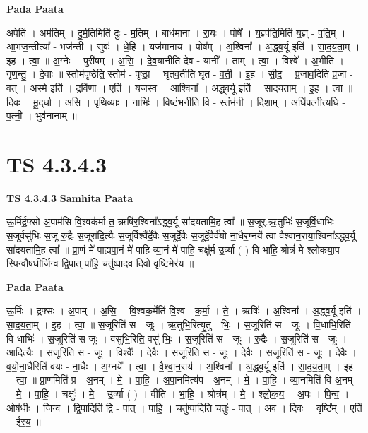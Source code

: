 \documentclass[17pt]{extarticle}
\begin{document}
\textbf{Pada Paata} \newline

अपेति॑ । अम॑तिम् । दु॒र्म॒तिमिति॑ दुः - म॒तिम् । बाध॑माना । रा॒यः । पोषे᳚ । य॒ज्ञ्प॑ति॒मिति॑ य॒ज्ञ् - प॒ति॒म् । आ॒भज॒न्तीत्या᳚ - भज॑न्ती । सुवः॑ । धे॒हि॒ । यज॑मानाय । पोष᳚म् । अ॒श्विना᳚ । अ॒द्ध्व॒र्यू इति॑ । सा॒द॒य॒ता॒म् । इ॒ह । त्वा॒ ॥ अ॒ग्नेः । पुरी॑षम् । अ॒सि॒ । दे॒व॒यानीति॑ देव - यानी᳚ । ताम् । त्वा॒ । विश्वे᳚ । अ॒भीति॑ । गृ॒ण॒न्तु॒ । दे॒वाः ॥ स्तोम॑पृ॒ष्ठेति॒ स्तोम॑ - पृ॒ष्ठा॒ । घृ॒तव॒तीति॑ घृ॒त - व॒ती॒ । इ॒ह । सी॒द॒ । प्र॒जाव॒दिति॑ प्र॒जा - व॒त् । अ॒स्मे इति॑ । द्रवि॑णा । एति॑ । य॒ज॒स्व॒ । आ॒श्विना᳚ । अ॒द्ध्व॒र्यू इति॑ । सा॒द॒य॒ता॒म् । इ॒ह । त्वा॒ ॥ दि॒वः । मू॒द्‌र्धा । अ॒सि॒ । पृ॒थि॒व्याः । नाभिः॑ । वि॒ष्टंभ॒नीति॑ वि - स्तंभ॑नी । दि॒शाम् । अधि॑प॒त्नीत्यधि॑ - प॒त्नी॒ । भुव॑नानाम् ॥  \newline





\section{ TS 4.3.4.3 }

\textbf{TS 4.3.4.3 } \newline
\textbf{Samhita Paata} \newline

ऊ॒र्मिर्द्र॒फ्सो अ॒पाम॑सि वि॒श्वक॑र्मा त॒ ऋषि॑र॒श्विना᳚ऽद्ध्व॒र्यू सा॑दयतामि॒ह त्वा᳚ ॥ स॒जूर्.ऋ॒तुभिः॑ स॒जूर्वि॒धाभिः॑ स॒जूर्वसु॑भिः स॒जू रु॒द्रैः स॒जूरा॑दि॒त्यैः स॒जूर्विश्वै᳚र्दे॒वैः स॒जूर्दे॒वैः स॒जूर्दे॒वैर्व॑यो-ना॒धैर॒ग्नये᳚ त्वा वैश्वान॒राया॒श्विना᳚ऽद्ध्व॒र्यू सा॑दयतामि॒ह त्वा᳚ ॥ प्रा॒णं मे॑ पाह्यपा॒नं मे॑ पाहि व्या॒नं मे॑ पाहि॒ चक्षु॑र्म उ॒र्व्या ( ) वि भा॑हि॒ श्रोत्रं॑ मे श्लोकया॒प-स्पि॒न्वौष॑धीर्जिन्व द्वि॒पात् पा॑हि॒ चतु॑ष्पादव दि॒वो वृष्टि॒मेर॑य ॥ \newline

\textbf{Pada Paata} \newline

ऊ॒र्मिः । द्र॒फ्सः । अ॒पाम् । अ॒सि॒ । वि॒श्वक॒र्मेति॑ वि॒श्व - क॒र्मा॒ । ते॒ । ऋषिः॑ । अ॒श्विना᳚ । अ॒द्ध्व॒र्यू इति॑ । सा॒द॒य॒ता॒म् । इ॒ह । त्वा॒ ॥ स॒जूरिति॑ स - जूः । ऋ॒तुभि॒रित्यृ॒तु - भिः॒ । स॒जूरिति॑ स - जूः । वि॒धाभि॒रिति॑ वि-धाभिः॑ । स॒जूरिति॑ स-जूः । वसु॑भि॒रिति॒ वसु॑-भिः॒ । स॒जूरिति॑ स - जूः । रु॒द्रैः । स॒जूरिति॑ स - जूः । आ॒दि॒त्यैः । स॒जूरिति॑ स - जूः । विश्वैः᳚ । दे॒वैः । स॒जूरिति॑ स - जूः । दे॒वैः । स॒जूरिति॑ स - जूः । दे॒वैः । व॒यो॒ना॒धैरिति॑ वयः - ना॒धैः । अ॒ग्नये᳚ । त्वा॒ । वै॒श्वा॒न॒राय॑ । अ॒श्विना᳚ । अ॒द्ध्व॒र्यू इति॑ । सा॒द॒य॒ता॒म् । इ॒ह । त्वा॒ ॥ प्रा॒णमिति॑ प्र - अ॒नम् । मे॒ । पा॒हि॒ । अ॒पा॒नमित्य॑प - अ॒नम् । मे॒ । पा॒हि॒ । व्या॒नमिति॑ वि-अ॒नम् । मे॒ । पा॒हि॒ । चक्षुः॑ । मे॒ । उ॒र्व्या ( ) । वीति॑ । भा॒हि॒ । श्रोत्र᳚म् । मे॒ । श्लो॒क॒य॒ । अ॒पः । पि॒न्व॒ । ओष॑धीः । जि॒न्व॒ । द्वि॒पादिति॑ द्वि - पात् । पा॒हि॒ । चतु॑ष्पा॒दिति॒ चतुः॑ - पा॒त् । अ॒व॒ । दि॒वः । वृष्टि᳚म् । एति॑ । ई॒र॒य॒ ॥  \newline
\end{document}
